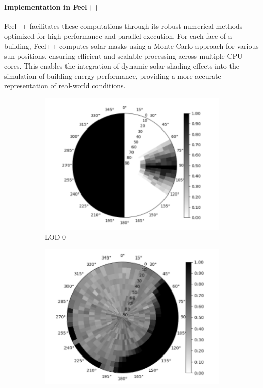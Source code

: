 \documentclass[runningheads]{llncs}
\begin{document}
\paragraph{Implementation in Feel++}
Feel++ facilitates these computations through its robust numerical methods optimized for high performance and parallel execution. For each face of a building, Feel++ computes solar masks using a Monte Carlo approach for various sun positions, ensuring efficient and scalable processing across multiple CPU cores. This enables the integration of dynamic solar shading effects into the simulation of building energy performance, providing a more accurate representation of real-world conditions.

\begin{figure}[htbp]
\centering
\begin{subfigure}{.4\textwidth}
  \centering
  \includegraphics[width=\linewidth]{images/solar-masks-east-facing.png}
  \caption{LOD-0}
  \label{fig:sm-building-east}
\end{subfigure}%
\begin{subfigure}{.4\textwidth}
  \centering
  \includegraphics[width=\linewidth]{images/solar-masks-whole-building.png}

\end{subfigure}
\end{figure}
\end{document}
